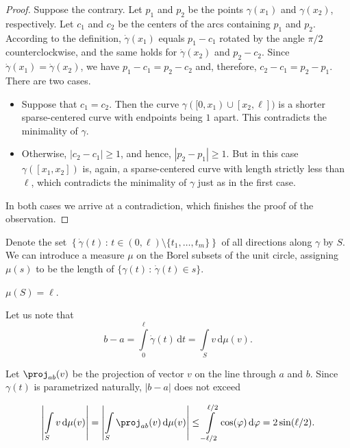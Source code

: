 \begin{proof}
Suppose the contrary. Let $p_1$ and $p_2$ be the points $\gamma(x_1)$ and $\gamma(x_2)$, respectively. Let $c_1$ and $c_2$ be the centers of the arcs containing $p_1$ and $p_2$. According to the definition, $\dot{\gamma}(x_1)$ equals $p_1 - c_1$ rotated by the angle $\pi/2$ counterclockwise, and the same holds for $\dot{\gamma}(x_2)$ and $p_2 - c_2$. Since $\dot{\gamma}(x_1) = \dot{\gamma}(x_2)$, we have $p_1 - c_1 = p_2 - c_2$ and, therefore, $c_2 - c_1 = p_2 - p_1$. There are two cases.

\begin{itemize}
    \item Suppose that $c_1 = c_2$. Then the curve $\gamma([0, x_1)\cup[x_2, \ell])$ is a shorter sparse-centered curve with endpoints being $1$ apart. This contradicts the minimality of $\gamma$.
    
    \item Otherwise, $|c_2 - c_1| \geq 1$, and hence, $|p_2 - p_1|\geq 1$. But in this case $\gamma([x_1, x_2])$ is, again, a sparse-centered curve with length strictly less than $\ell$, which contradicts the minimality of $\gamma$ just as in the first case.
\end{itemize}

In both cases we arrive at a contradiction, which finishes the proof of the observation.
\end{proof}

Denote the set $\left\{\dot{\gamma}(t)\,\colon\,t\in(0, \ell)\setminus\{t_1, \ldots, t_m\}\right\}$ of all directions along $\gamma$ by $S$.
We can introduce a measure $\mu$ on the Borel subsets of the unit circle, assigning $\mu(s)$ to be the length of $\{\gamma(t)\,\colon\,\dot{\gamma}(t)\in s\}$.

\begin{corollary}
$\mu(S) = \ell$.
\end{corollary}

Let us note that $$b - a = \int\limits_0^{\ell}\dot{\gamma}(t)\,\mathrm{d}t = \int\limits_Sv\,\mathrm{d}\mu(v).$$

Let $\proj_{ab}(v)$ be the projection of vector $v$ on the line through $a$ and $b$. Since $\gamma(t)$ is parametrized naturally, $|b - a|$ does not exceed

$$\left|\int\limits_Sv\,\mathrm{d}\mu(v)\right| = \left|\int\limits_S\proj_{ab}(v)\,\mathrm{d}\mu(v)\right| \leq \int\limits_{-\ell/2}^{\ell/2}\cos(\varphi)\,\mathrm{d}\varphi = 2\sin(\ell/2).$$

